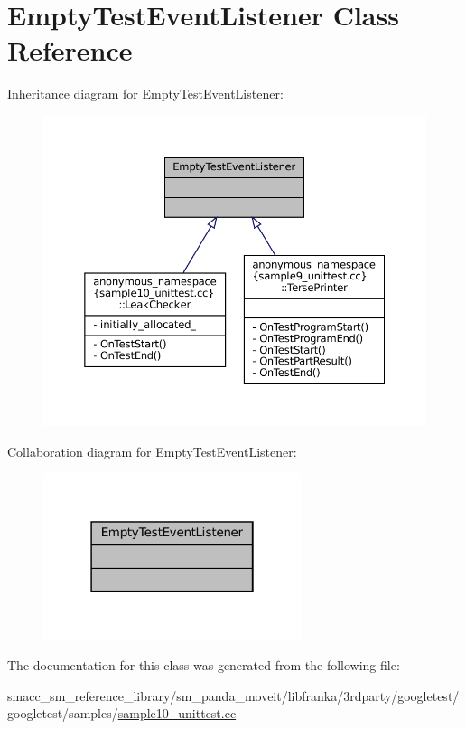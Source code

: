 \hypertarget{classEmptyTestEventListener}{}\section{Empty\+Test\+Event\+Listener Class Reference}
\label{classEmptyTestEventListener}


Inheritance diagram for Empty\+Test\+Event\+Listener\+:
\nopagebreak
\begin{figure}[H]
\begin{center}
\leavevmode
\includegraphics[width=350pt]{classEmptyTestEventListener__inherit__graph}
\end{center}
\end{figure}


Collaboration diagram for Empty\+Test\+Event\+Listener\+:
\nopagebreak
\begin{figure}[H]
\begin{center}
\leavevmode
\includegraphics[width=214pt]{classEmptyTestEventListener__coll__graph}
\end{center}
\end{figure}


The documentation for this class was generated from the following file\+:\begin{DoxyCompactItemize}
\item 
smacc\+\_\+sm\+\_\+reference\+\_\+library/sm\+\_\+panda\+\_\+moveit/libfranka/3rdparty/googletest/googletest/samples/\hyperlink{sample10__unittest_8cc}{sample10\+\_\+unittest.\+cc}\end{DoxyCompactItemize}
